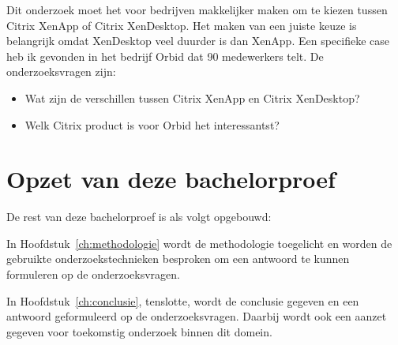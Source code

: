 Dit onderzoek moet het voor bedrijven makkelijker maken om te kiezen tussen Citrix XenApp of Citrix XenDesktop. Het maken van een juiste keuze is belangrijk omdat XenDesktop veel duurder is dan XenApp. Een specifieke case heb ik gevonden in het bedrijf Orbid dat 90 medewerkers telt. De onderzoeksvragen zijn:

\begin{itemize}
\item Wat zijn de verschillen tussen Citrix XenApp en Citrix XenDesktop?
\item Welk Citrix product is voor Orbid het interessantst?
\end{itemize}

\section{Opzet van deze bachelorproef}
\label{sec:opzet-bachelorproef}


De rest van deze bachelorproef is als volgt opgebouwd:

In Hoofdstuk~\ref{ch:methodologie} wordt de methodologie toegelicht en worden de gebruikte onderzoekstechnieken besproken om een antwoord te kunnen formuleren op de onderzoeksvragen.


In Hoofdstuk~\ref{ch:conclusie}, tenslotte, wordt de conclusie gegeven en een antwoord geformuleerd op de onderzoeksvragen. Daarbij wordt ook een aanzet gegeven voor toekomstig onderzoek binnen dit domein.

